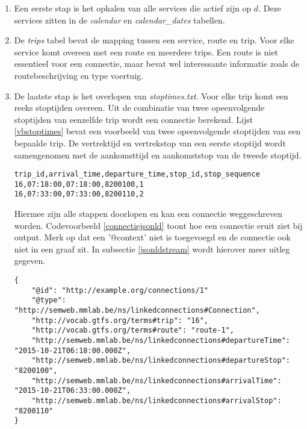 \begin{enumerate}
\item Een eerste stap is het ophalen van alle services die actief zijn op $d$. Deze services zitten in de \textit{calendar} en \textit{calendar\_dates} tabellen.
\item De \textit{trips} tabel bevat de mapping tussen een service, route en trip. Voor elke service komt overeen met een route en meerdere trips. Een route is niet essentieel voor een connectie, maar bevat wel interessante informatie zoals de routebeschrijving en type voertuig.
\item De laatste stap is het overlopen van \textit{stoptimes.txt}. Voor elke trip komt een reeks stoptijden overeen. Uit de combinatie van twee opeenvolgende stoptijden van eenzelfde trip wordt een connectie berekend. Lijst \ref{vbstoptimes} bevat een voorbeeld van twee opeenvolgende stoptijden van een bepaalde trip. De vertrektijd en vertrekstop van een eerste stoptijd wordt samengenomen met de aankomsttijd en aankomststop van de tweede stoptijd. 

\begin{lstlisting}[label=vbstoptimes,caption=Voorbeeldstoptijden uit GTFS \textit{stop\_times.txt}.]
trip_id,arrival_time,departure_time,stop_id,stop_sequence
16,07:18:00,07:18:00,8200100,1
16,07:33:00,07:33:00,8200110,2
\end{lstlisting}

Hiermee zijn alle stappen doorlopen en kan een connectie weggeschreven worden. Codevoorbeeld \ref{connectiejsonld} toont hoe een connectie eruit ziet bij output. Merk op dat een '@context' niet is toegevoegd en de connectie ook niet in een graaf zit. In subsectie \ref{jsonldstream} wordt hierover meer uitleg gegeven.

\begin{lstlisting}[label=connectiejsonld,caption=Voorbeeld van een connectie voor een bepaalde trip in JSON-LD formaat.]
{	
	"@id": "http://example.org/connections/1"
	"@type": "http://semweb.mmlab.be/ns/linkedconnections#Connection",
	"http://vocab.gtfs.org/terms#trip": "16",
	"http://vocab.gtfs.org/terms#route": "route-1",
	"http://semweb.mmlab.be/ns/linkedconnections#departureTime": "2015-10-21T06:18:00.000Z",
	"http://semweb.mmlab.be/ns/linkedconnections#departureStop": "8200100",
	"http://semweb.mmlab.be/ns/linkedconnections#arrivalTime": "2015-10-21T06:33:00.000Z",
	"http://semweb.mmlab.be/ns/linkedconnections#arrivalStop": "8200110"
}
\end{lstlisting}
\end{enumerate}

